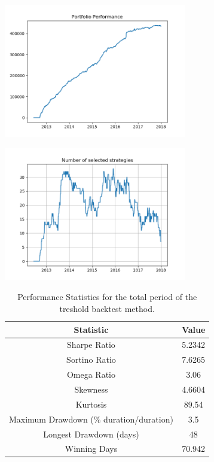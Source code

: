\begin{center}
	\centering
	\includegraphics[width=0.6\textwidth]{GridSearches/Threshold_Backtest/PnL_Out_of_Sample.png}
	
\end{center}

\begin{center}
	\centering
	\includegraphics[width=0.6\textwidth]{GridSearches/Threshold_Backtest/num_strats_Out_of_Sample.png}
	\label{Threshold_Backtest_OOS_n_strats}
\end{center}

\begin{table}
	\centering
	\begin{tabular}{c|c}
		\textbf{Statistic} & \textbf{Value} \\\hline
		Sharpe Ratio & 5.2342 \\ 
		Sortino Ratio & 7.6265 \\ 
		Omega Ratio & 3.06 \\ 
		Skewness & 4.6604 \\ 
		Kurtosis & 89.54 \\ 
		Maximum Drawdown (\% duration/duration) & 3.5 \\ 
		Longest Drawdown (days) & 48 \\ 
		Winning Days & 70.942 \\ 
	\end{tabular}
	\label{table:tot_perf_threshold_backtest}
	\caption{\label{table:tot_perf_threshold_backtest} Performance Statistics for the total period of the treshold backtest method.}
\end{table}

